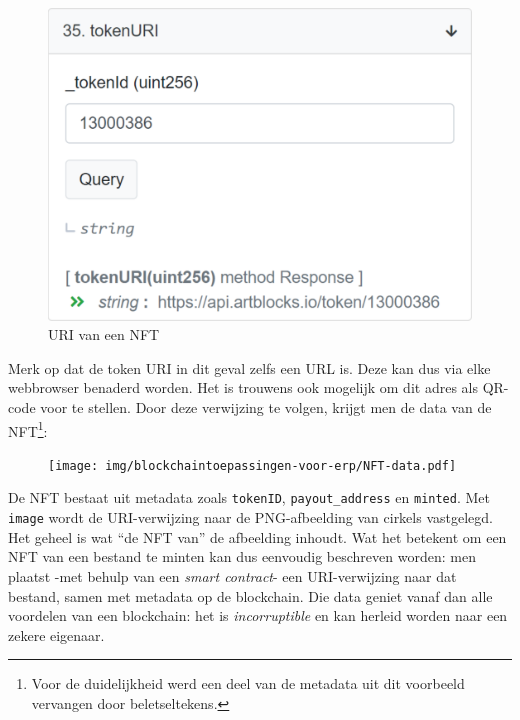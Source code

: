 \begin{figure}[H]
	\centering
	\includegraphics[width=0.5\linewidth]{img/blockchaintoepassingen-voor-erp/nft-tokenURI.png}
	\caption{\label{fig:nft-tokenURI}URI van een NFT}
\end{figure}

Merk op dat de token URI in dit geval zelfs een URL is. Deze kan dus via elke webbrowser benaderd worden. Het is trouwens ook mogelijk om dit adres als QR-code voor te stellen. Door deze verwijzing te volgen, krijgt men de data van de NFT\footnote{Voor de duidelijkheid werd een deel van de metadata uit dit voorbeeld vervangen door beletseltekens.}:

\begin{figure}[H]
	\centering
	\texttt{[image: img/blockchaintoepassingen-voor-erp/NFT-data.pdf]}
\end{figure}

De NFT bestaat uit metadata zoals \verb|tokenID|, \verb*|payout_address| en \verb|minted|. Met \verb*|image| wordt de URI-verwijzing naar de PNG-afbeelding van cirkels vastgelegd. Het geheel is wat ``de NFT van'' de afbeelding inhoudt. 
Wat het betekent om een NFT van een bestand te minten kan dus eenvoudig beschreven worden: men plaatst -met behulp van een \textit{smart contract}- een URI-verwijzing naar dat bestand, samen met metadata op de blockchain. Die data geniet vanaf dan alle voordelen van een blockchain: het is \textit{incorruptible} en kan herleid worden naar een zekere eigenaar.
